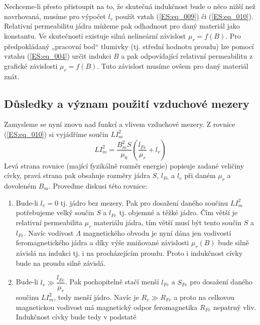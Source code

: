 {      Nechceme-li přesto přistoupit na to, že skutečná indukčnost bude o něco nižší než navrhovaná,
      musíme pro výpočet \(l_v\) použít vztah (\ref{ES:eq_009}) či (\ref{ES:eq_010}). Relativní 
      permeabilitu jádra můžeme pak odhadnout pro daný materiál jako konstantu. Ve skutečnosti 
      existuje silná nelineární závislost \(\mu_r = f(B)\). Pro předpokládaný „pracovní bod“ 
      tlumivky (tj. střední hodnotu proudu) lze pomocí vztahu (\ref{ES:eq_004}) určit indukci \(B\) 
      a pak odpovídající relativní permeabilitu z grafické závislosti \(\mu_r = f(B)\). Tuto 
      závislost musíme ovšem pro daný materiál znát.
      
    \subsection{Důsledky a význam použití vzduchové mezery}
      Zamysleme se nyní znovu nad funkcí a vlivem vzduchové mezery. Z rovnice (\ref{ES:eq_010}) si 
      vyjádříme součin \(LI_m^2\)
      \begin{equation}\label{ES:eq_012}
        LI_m^2 = \frac{B_m^2S}{\mu_0}\left(\frac{l_{Fe}}{\mu_r}+l_v\right)
      \end{equation}
      Levá strana rovnice (mající fyzikálně rozměr energie) popisuje zadané veličiny cívky, pravá 
      strana pak obsahuje rozměry jádra \(S\), \(l_{Fe}\) a \(l_v\) při daném \(\mu_r\) a dovoleném 
      \(B_m\). Proveďme diskusi této rovnice:
      \begin{enumerate}
        \item Bude-li \(l_v = 0\) tj. jádro bez mezery. Pak pro dosažení daného součinu 
              \(LI_m^2\) potřebujeme velký součin \(S\) a \(l_{Fe}\) tj. objemné a těžké jádro. Čím 
              větší je relativní permeabilita \(\mu_r\) materiálu jádra, tím větší musí být tento 
              součin \(S\) a \(l_{Fe}\). Navíc vodivost \(\Lambda\) magnetického obvodu je nyní 
              dána jen vodivostí feromagnetického jádra a díky výše zmiňované závislosti 
              \(\mu_r(B)\) bude silně závislá na indukci tj. i na procházejícím proudu. Proto i 
              indukčnost cívky bude na proudu silně závislá.
        \item Bude-li \(l_v\gg \dfrac{l_{Fe}}{\mu_r}\). Pak pochopitelně stačí menší \(l_{Fe}\) a 
              \(S_{Fe}\) pro dosažení daného součinu \(LI_m^2\), tedy menší jádro. Navíc je 
              \(R_v\gg R_{Fe}\) a proto na celkovou magnetickou vodivost má magnetický odpor
              feromagnetika \(R_{Fe}\) nepatrný vliv. Indukčnost cívky bude tedy v podstatě 

\end{enumerate}}
